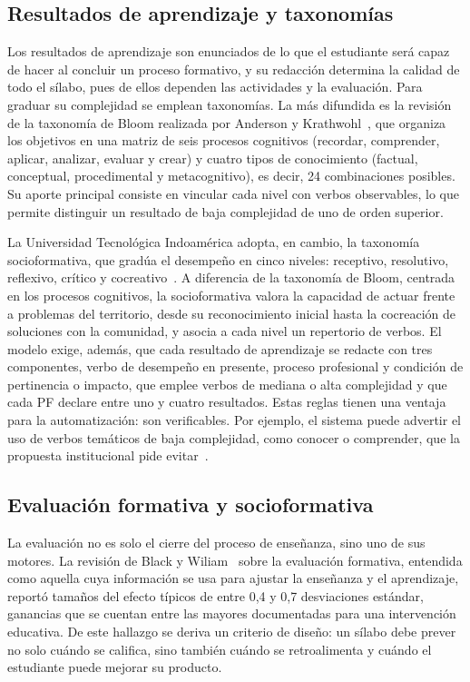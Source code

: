 \subsection{Resultados de aprendizaje y taxonomías}
Los resultados de aprendizaje son enunciados de lo que el estudiante será capaz de hacer al concluir un proceso formativo, y su redacción determina la calidad de todo el sílabo, pues de ellos dependen las actividades y la evaluación. Para graduar su complejidad se emplean taxonomías. La más difundida es la revisión de la taxonomía de Bloom realizada por Anderson y Krathwohl~\cite{anderson2001taxonomy}, que organiza los objetivos en una matriz de seis procesos cognitivos (recordar, comprender, aplicar, analizar, evaluar y crear) y cuatro tipos de conocimiento (factual, conceptual, procedimental y metacognitivo), es decir, 24 combinaciones posibles. Su aporte principal consiste en vincular cada nivel con verbos observables, lo que permite distinguir un resultado de baja complejidad de uno de orden superior.

La Universidad Tecnológica Indoamérica adopta, en cambio, la taxonomía socioformativa, que gradúa el desempeño en cinco niveles: receptivo, resolutivo, reflexivo, crítico y cocreativo~\cite{uti2026modelo}. A diferencia de la taxonomía de Bloom, centrada en los procesos cognitivos, la socioformativa valora la capacidad de actuar frente a problemas del territorio, desde su reconocimiento inicial hasta la cocreación de soluciones con la comunidad, y asocia a cada nivel un repertorio de verbos. El modelo exige, además, que cada resultado de aprendizaje se redacte con tres componentes, verbo de desempeño en presente, proceso profesional y condición de pertinencia o impacto, que emplee verbos de mediana o alta complejidad y que cada PF declare entre uno y cuatro resultados. Estas reglas tienen una ventaja para la automatización: son verificables. Por ejemplo, el sistema puede advertir el uso de verbos temáticos de baja complejidad, como conocer o comprender, que la propuesta institucional pide evitar~\cite{uti2026propuesta}.

\subsection{Evaluación formativa y socioformativa}
La evaluación no es solo el cierre del proceso de enseñanza, sino uno de sus motores. La revisión de Black y Wiliam~\cite{black1998blackbox} sobre la evaluación formativa, entendida como aquella cuya información se usa para ajustar la enseñanza y el aprendizaje, reportó tamaños del efecto típicos de entre 0,4 y 0,7 desviaciones estándar, ganancias que se cuentan entre las mayores documentadas para una intervención educativa. De este hallazgo se deriva un criterio de diseño: un sílabo debe prever no solo cuándo se califica, sino también cuándo se retroalimenta y cuándo el estudiante puede mejorar su producto.


